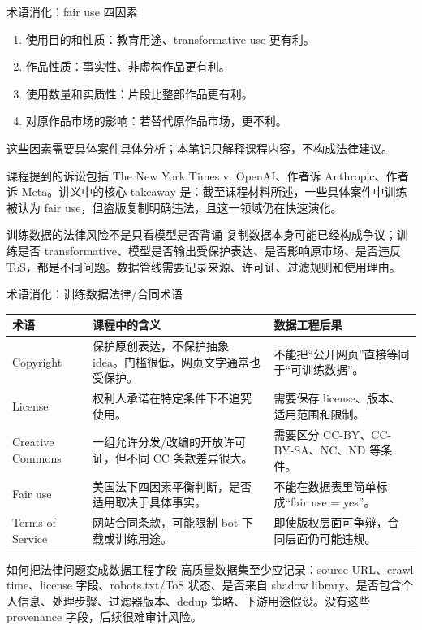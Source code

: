 \documentclass[a4paper]{article}
\begin{document}
\begin{importantbox}{术语消化：fair use 四因素}
\begin{enumerate}
    \item 使用目的和性质：教育用途、transformative use 更有利。
    \item 作品性质：事实性、非虚构作品更有利。
    \item 使用数量和实质性：片段比整部作品更有利。
    \item 对原作品市场的影响：若替代原作品市场，更不利。
\end{enumerate}
这些因素需要具体案件具体分析；本笔记只解释课程内容，不构成法律建议。
\end{importantbox}

课程提到的诉讼包括 The New York Times v. OpenAI、作者诉 Anthropic、作者诉 Meta。讲义中的核心 takeaway 是：截至课程材料所述，一些具体案件中训练被认为 fair use，但盗版复制明确违法，且这一领域仍在快速演化。

\begin{warningbox}{训练数据的法律风险不是只看模型是否背诵}
复制数据本身可能已经构成争议；训练是否 transformative、模型是否输出受保护表达、是否影响原市场、是否违反 ToS，都是不同问题。数据管线需要记录来源、许可证、过滤规则和使用理由。
\end{warningbox}

\begin{knowledgebox}{术语消化：训练数据法律/合同术语}
\begin{tabular}{L{0.2\textwidth}L{0.36\textwidth}L{0.34\textwidth}}
\toprule
术语 & 课程中的含义 & 数据工程后果 \\
\midrule
Copyright & 保护原创表达，不保护抽象 idea。门槛很低，网页文字通常也受保护。 & 不能把“公开网页”直接等同于“可训练数据”。 \\
License & 权利人承诺在特定条件下不追究使用。 & 需要保存 license、版本、适用范围和限制。 \\
Creative Commons & 一组允许分发/改编的开放许可证，但不同 CC 条款差异很大。 & 需要区分 CC-BY、CC-BY-SA、NC、ND 等条件。 \\
Fair use & 美国法下四因素平衡判断，是否适用取决于具体事实。 & 不能在数据表里简单标成“fair use = yes”。 \\
Terms of Service & 网站合同条款，可能限制 bot 下载或训练用途。 & 即使版权层面可争辩，合同层面仍可能违规。 \\
\bottomrule
\end{tabular}
\end{knowledgebox}

\begin{importantbox}{如何把法律问题变成数据工程字段}
高质量数据集至少应记录：source URL、crawl time、license 字段、robots.txt/ToS 状态、是否来自 shadow library、是否包含个人信息、处理步骤、过滤器版本、dedup 策略、下游用途假设。没有这些 provenance 字段，后续很难审计风险。
\end{importantbox}
\end{document}
